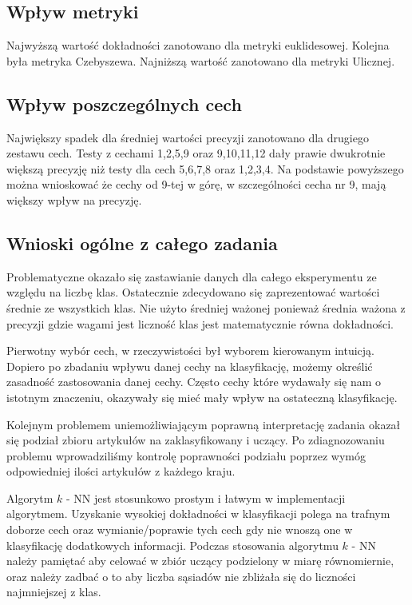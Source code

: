 \documentclass{classrep}
\begin{document}
\subsection{Wpływ metryki}
Najwyższą wartość dokładności zanotowano dla metryki euklidesowej. Kolejna była metryka Czebyszewa. Najniższą wartość zanotowano dla metryki Ulicznej.


\subsection{Wpływ poszczególnych cech}
Największy spadek dla średniej wartości precyzji zanotowano dla drugiego zestawu cech. Testy z cechami 1,2,5,9 oraz 9,10,11,12 dały prawie dwukrotnie większą precyzję niż testy dla cech 5,6,7,8 oraz 1,2,3,4. Na podstawie powyższego można wnioskować że cechy od 9-tej w górę, w szczególności cecha nr 9, mają większy wpływ na precyzję.

\subsection{Wnioski ogólne z całego zadania}
Problematyczne okazało się zastawianie danych dla całego eksperymentu ze względu na liczbę klas. Ostatecznie zdecydowano się zaprezentować wartości średnie ze wszystkich klas. Nie użyto średniej ważonej ponieważ średnia ważona z precyzji gdzie wagami jest liczność klas jest matematycznie równa dokładności.
\newline

Pierwotny wybór cech, w rzeczywistości był wyborem kierowanym intuicją. Dopiero po zbadaniu wpływu danej cechy na klasyfikację, możemy określić zasadność zastosowania danej cechy. Często cechy które wydawały się nam o istotnym znaczeniu, okazywały się mieć mały wpływ na ostateczną klasyfikację.
\newline

Kolejnym problemem uniemożliwiającym poprawną interpretację zadania okazał się podział zbioru artykułów na zaklasyfikowany i uczący. Po zdiagnozowaniu problemu wprowadziliśmy kontrolę poprawności podziału poprzez wymóg odpowiedniej ilości artykułów z każdego kraju.
\newline

Algorytm $k$ - NN jest stosunkowo prostym i łatwym w implementacji algorytmem. Uzyskanie wysokiej dokładności w klasyfikacji polega na trafnym doborze cech oraz wymianie/poprawie tych cech gdy nie wnoszą one w klasyfikację dodatkowych informacji. Podczas stosowania algorytmu $k$ - NN należy pamiętać aby celować w zbiór uczący podzielony w miarę równomiernie, oraz należy zadbać o to aby liczba sąsiadów nie zbliżała się do liczności najmniejszej z klas.
\newline
\end{document}
